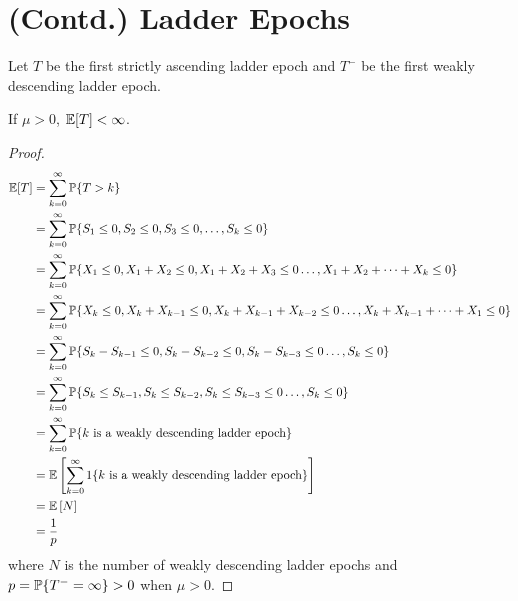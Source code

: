 \documentclass[all-lectures.tex]{subfiles}
\begin{document}

\setcounter{section}{1}
\setcounter{subsection}{1}
\section*{}
\section{(Contd.) Ladder Epochs}
Let $T$ be the first strictly ascending ladder epoch and $T^-$ be the first  weakly descending ladder epoch.
\begin{lem}
If $\mu > 0$, $\E[T] < \infty$. 
\begin{proof}
\begin{align*}
\E[T] &= \sum_{k=0}^\infty \P\{T > k\} \\
&= \sum_{k=0}^\infty \P\{S_1\leq 0,S_2 \leq 0,S_3 \leq 0,\dots,S_k \leq 0\} \\
&= \sum_{k=0}^\infty \P\{X_1 \leq 0,X_1+X_2 \leq 0,X_1+X_2+X_3 \leq 0\dots,X_1+X_2+\dots+X_k \leq 0\} \\
&= \sum_{k=0}^\infty \P\{X_k \leq 0,X_{k}+X_{k-1} \leq 0,X_k+X_{k-1}+X_{k-2} \leq 0\dots,X_k+X_{k-1}+\dots+X_1 \leq 0\} \\
&= \sum_{k=0}^\infty \P\{S_k - S_{k-1} \leq 0,S_k - S_{k-2} \leq 0,S_k - S_{k-3} \leq 0\dots,S_k \leq 0\} \\
&= \sum_{k=0}^\infty \P\{S_k \leq S_{k-1},S_k \leq S_{k-2} ,S_k \leq S_{k-3} \leq 0\dots,S_k \leq 0\} \\
&= \sum_{k=0}^\infty \P\{\text{$k$ is a weakly descending ladder epoch}\} \\
&= \E \left[ \sum_{k=0}^\infty 1\{\text{$k$ is a weakly descending ladder epoch}\} \right]\\
&= \E \left[ N \right]\\
&= \frac{1}{p}
\end{align*}
where $N$ is the number of weakly descending ladder epochs and $p = \P\{T^- = \infty\} > 0$ when $\mu > 0$.
\end{proof}
\end{lem}
\end{document}
